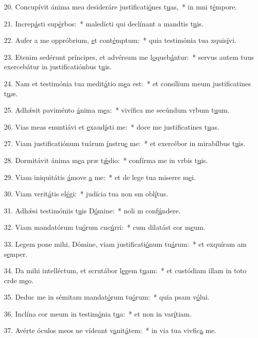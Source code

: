 20. Concupívit ánima mea desideráre justificati\uline{ó}nes t\uline{u}as,~* in mni t\uline{é}mpore.\par 
21. Increp\uline{á}sti sup\uline{é}rbos:~* maledícti qui declínant a mandtis t\uline{u}is.\par 
22. Aufer a me oppróbrium, \uline{e}t cont\uline{é}mptum:~* quia testimónia tua xquis\uline{í}vi.\par 
23. Etenim sedérunt príncipes, et advérsum me l\uline{o}queb\uline{á}ntur:~* servus autem tuus exercebátur in justificatiónbus t\uline{u}is.\par 
24. Nam et testimónia tua medit\uline{á}tio m\uline{e}a est:~* et consílium meum justificatines t\uline{u}æ.\par 
25. Adhǽsit paviménto \uline{á}nima m\uline{e}a:~* vivífica me secúndum vrbum t\uline{u}um.\par 
26. Vias meas enuntiávi et \uline{e}xaud\uline{í}sti me:~* doce me justificatines t\uline{u}as.\par 
27. Viam justificatiónum tuárum \uline{í}nstru\uline{e} me:~* et exercébor in mirabílbus t\uline{u}is.\par 
28. Dormitávit ánima m\uline{e}a præ t\uline{ǽ}dio:~* confírma me in vrbis t\uline{u}is.\par 
29. Viam iniquitátis \uline{á}move \uline{a} me:~* et de lege tua miserre m\uline{e}i.\par 
30. Viam verit\uline{á}tis el\uline{é}gi:~* judícia tua non sm obl\uline{í}tus.\par 
31. Adhǽsi testimóniis t\uline{u}is D\uline{ó}mine:~* noli m conf\uline{ú}ndere.\par 
32. Viam mandatórum tu\uline{ó}rum cuc\uline{ú}rri:~* cum dilatást cor m\uline{e}um.\par 
33. Legem pone mihi, Dómine, viam justificati\uline{ó}num tu\uline{á}rum:~* et exquíram am s\uline{e}mper.\par 
34. Da mihi intelléctum, et scrutábor l\uline{e}gem t\uline{u}am:~* et custódiam illam in toto crde m\uline{e}o.\par 
35. Deduc me in sémitam mandat\uline{ó}rum tu\uline{ó}rum:~* quia psam v\uline{ó}lui.\par 
36. Inclína cor meum in testim\uline{ó}nia t\uline{u}a:~* et non in var\uline{í}tiam.\par 
37. Avérte óculos meos ne vídeant v\uline{a}nit\uline{á}tem:~* in via tua vivfic\uline{a} me.\par 
